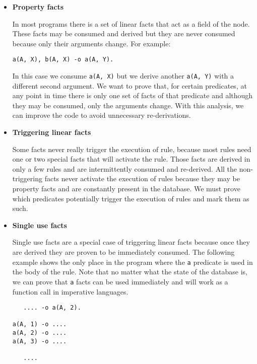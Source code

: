 \begin{itemize}
   
   \item \textbf{Property facts}
   
   In most programs there is a set of linear facts that act as a field of the node. These facts may
   be consumed and derived but they are never consumed because only their arguments change.
   For example:

\begin{Verbatim}
a(A, X), b(A, X) -o a(A, Y).
\end{Verbatim}

   In this case we consume \texttt{a(A, X)} but we derive another \texttt{a(A, Y)} with a different
   second argument. We want to prove that, for certain predicates, at any point in time there is only one
   set of facts of that predicate and although they may be consumed, only the arguments change.
   With this analysis, we can improve the code to avoid unnecessary re-derivations.
   
   \item \textbf{Triggering linear facts}
   
   Some facts never really trigger the execution of rule, because most rules need one or two special facts that
   will activate the rule. Those facts are derived in only a few rules and are intermittently consumed and
   re-derived. All the non-triggering facts never activate the execution of rules because they may be
   property facts and are constantly present in the database.
   We must prove which predicates potentially trigger the execution of rules and mark them as such.
   
   \item \textbf{Single use facts}
   
   Single use facts are a special case of triggering linear facts because once they are derived they are
   proven to be immediately consumed. The following example shows the only place in the program where
   the \texttt{a} predicate is used in the body of the rule. Note that no matter what the state of
   the database is, we can prove that \texttt{a} facts can be used immediately and will work as a function
   call in imperative languages.
   
   \begin{Verbatim}
   .... -o a(A, 2).

a(A, 1) -o ....
a(A, 2) -o ....
a(A, 3) -o ....

   ....
   \end{Verbatim}
    
\end{itemize}

